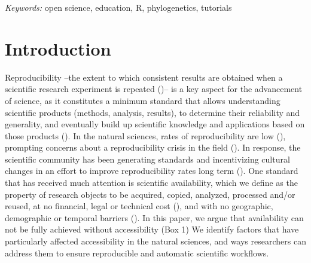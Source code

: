 \documentclass[12pt]{article}
\begin{document}
\noindent%
{\it Keywords:}  open science, education, R, phylogenetics, tutorials
\vfill

\newpage
{} %
\section*{Introduction}
\label{sec:intro}

Reproducibility --the extent to which consistent results are obtained when a scientific
research experiment is repeated (\cite{repdef2021})-- is a key aspect for the advancement
of science, as it constitutes a minimum standard that allows understanding scientific products
(methods, analysis, results),
to determine their reliability and generality, and eventually build up scientific
knowledge and applications based on those products
(\cite{king1995replication, peng2011reproducible, powers2019open}).
In the natural sciences, rates of reproducibility are low (\cite{ioannidis2005most, prinz2011believe}),
prompting concerns about a reproducibility crisis in the field (\cite{baker2016reproducibility}).
In response, the scientific community has been generating standards and incentivizing
cultural changes in an effort to improve reproducibility rates long term
(\cite{peng2015reproducibility, wilkinson2016fair}).
One standard that has received much attention is scientific availability, which
 we define as the property of research objects to be acquired, copied, analyzed,
  processed and/or reused, at no financial, legal or technical cost (\cite{arnold2019turing}),
   and with no geographic, demographic or temporal barriers (\cite{fecher2014open}).
In this paper, we argue that availability can not be fully achieved without accessibility (Box 1)
We identify factors that have particularly affected accessibility in
the natural sciences, and ways researchers can address them to ensure reproducible
and automatic scientific workflows.


\bigskip
\bigskip
\end{document}
